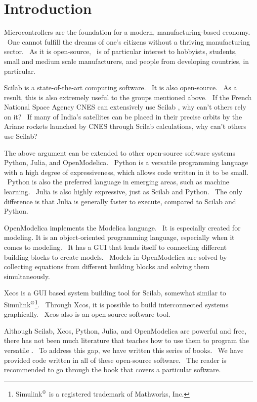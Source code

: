 \chapter{Introduction}
\thispagestyle{empty}
\label{sec:intro}
Microcontrollers are the foundation for a modern, manufacturing-based
economy.  One cannot fulfill the dreams of one's citizens without a
thriving manufacturing sector.  As it is open-source, \arduino\ is of
particular interest to hobbyists, students, small and medium scale
manufacturers, and people from developing countries, in particular.

Scilab is a state-of-the-art computing software.  It is also open-source.  As a result, this is also extremely useful to the groups
mentioned above.  If the French National Space Agency CNES can
extensively use Scilab \cite{CNES-Scilab}, why can't others rely on
it?  If many of India's satellites can be placed in their precise
orbits by the Ariane rockets launched by CNES through Scilab
calculations, why can't others use Scilab?

The above argument can be extended to other open-source software
systems Python, Julia, and OpenModelica.  Python is a versatile
programming language with a high degree of expressiveness, which
allows code written in it to be small.  Python is also the preferred
language in emerging areas, such as machine learning.  Julia is also
highly expressive, just as Scilab and Python.  The only difference is
that Julia is generally faster to execute, compared to Scilab and
Python.

OpenModelica implements the Modelica language.  It is especially
created for modeling. It is an object-oriented programming language,
especially when it comes to modeling.  It has a GUI that lends itself
to connecting different building blocks to create models.  Models in
OpenModelica are solved by collecting equations from different
building blocks and solving them simultaneously.

Xcos is a GUI based system building tool for Scilab, somewhat similar
to
Simulink$^{\text{\textregistered}}$\footnote{Simulink$^{\text{\textregistered}}$
  is a registered trademark of Mathworks, Inc.}.  Through Xcos, it is
possible to build interconnected systems graphically.  Xcos also is an
open-source software tool.

Although Scilab, Xcos, Python, Julia, and OpenModelica are powerful and
free, there has not been much literature that teaches how to use them
to program the versatile \arduino.  To address this gap, we have
written this series of books.  We have provided code written in all of
these open-source software.  The reader is recommended to go through
the book that covers a particular software.

